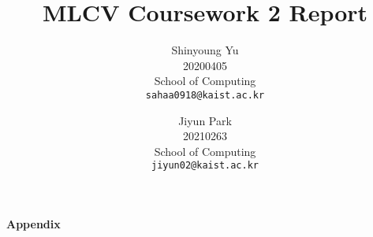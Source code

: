 \documentclass[10pt,twocolumn,letterpaper]{article}
\begin{document}
\pagestyle{plain}

\title{MLCV Coursework 2 Report}

\author{Shinyoung Yu\\
20200405\\
School of Computing\\
{\tt\small sahaa0918@kaist.ac.kr}
\and
Jiyun Park\\
20210263\\
School of Computing\\
{\tt\small jiyun02@kaist.ac.kr}
}

\maketitle

%    





\onecolumn
\newpage
{\LARGE 
	\textbf{Appendix}\par}
\appendix


% 
\end{document}

